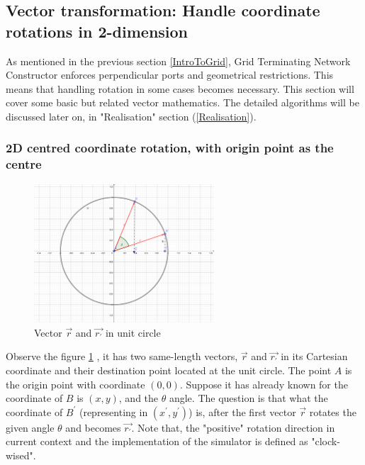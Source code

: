 \subsection{Vector transformation: Handle coordinate rotations in 2-dimension}

\par\noindent
As mentioned in the previous section \ref{IntroToGrid}, Grid Terminating Network Constructor enforces perpendicular ports
and geometrical restrictions. This means that handling rotation in some cases becomes necessary.
This section will cover some basic but related vector mathematics. The detailed algorithms will be discussed later on, in "Realisation" section (\ref{Realisation}).

\subsubsection{2D centred coordinate rotation, with origin point as the centre}
\par\noindent
\begin{figure}[H]
\begin{center}
\includegraphics[width=0.6\textwidth]{res/2d_vector.pdf}
\caption{Vector $\vec{r}$ and $\vec{r_{'}}$ in unit circle}
\label{vectorG}
\end{center}
\end{figure}

\par\noindent
Observe the figure \ref{vectorG} , it has two same-length vectors,  $\vec{r}$ and $\vec{r_{'}}$ in its Cartesian coordinate and their destination point located at the unit circle.
The point $A$ is the origin point with coordinate $(0, 0)$. Suppose it has already known for the coordinate of $B$ is
$(x,y)$, and the $\theta$ angle. The question is that what the coordinate of $B^{'}$ (representing in $(x^{'},y^{'})$) is, after the first vector $\vec{r}$ rotates the given angle $\theta$ and becomes $\vec{r_{'}}$.
Note that, the "positive" rotation direction in current context and the implementation of the simulator is defined as "clock-wised".


